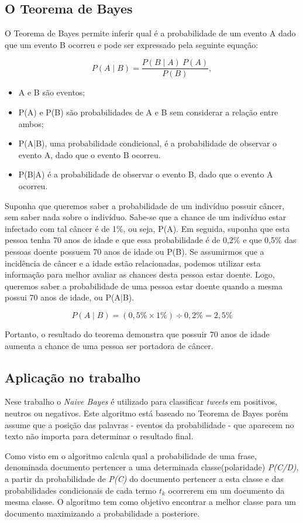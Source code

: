 \subsection{O Teorema de Bayes}

O Teorema de Bayes permite inferir qual é a probabilidade de um evento A dado que um evento B ocorreu e pode ser expressado pela seguinte equação:

$$ P(A \mid B) = \frac{P(B \mid A) \ P(A)}{P(B)}, $$

\begin{itemize}
	\item A e B são eventos;
	\item P(A) e P(B) são probabilidades de A e B sem considerar a relação entre ambos;
	\item P(A|B), uma probabilidade condicional, é a probabilidade de observar o evento A, dado que o evento B ocorreu.
	\item P(B|A) é a probabilidade de observar o evento B, dado que o evento A ocorreu.
\end{itemize}

Suponha que queremos saber a probabilidade de um indivíduo possuir câncer, sem saber nada sobre o indivíduo. Sabe-se que a chance de um indivíduo estar infectado com tal câncer é de 1\%, ou seja, P(A).
Em seguida, suponha que esta pessoa tenha 70 anos de idade e que essa probabilidade é de 0,2\% e que 0,5\% das pessoas doente possuem 70 anos de idade ou P(B). Se assumirmos que a incidência de câncer e a idade estão relacionadas, podemos utilizar esta informação para melhor avaliar as chances desta pessoa estar doente. Logo, queremos saber a probabilidade de uma pessoa estar doente quando a mesma possui 70 anos de idade, ou P(A|B).

$$ P(A \mid B) = (0,5\% \times 1\%) \div 0,2\% = 2,5\% $$

Portanto, o resultado do teorema demonstra que possuir 70 anos de idade aumenta a chance de uma pessoa ser portadora de câncer.

\subsection{Aplicação no trabalho}

Nese trabalho o \emph{Naive Bayes} é utilizado  para classificar \textit{tweets} em positivos, neutros ou negativos. Este algoritmo está baseado no Teorema de Bayes porém assume que a posição das palavras - eventos da probabilidade - que aparecem no texto não importa para determinar o resultado final.

Como visto em \cite{lucca2013implementaccao} o algoritmo calcula qual a probabilidade de uma frase, denominada documento pertencer a uma determinada classe(polaridade) \emph{P(C/D)}, a partir da probabilidade de \emph{P(C)} do documento pertencer a esta classe e das probabilidades condicionais de cada termo $t_{k}$ ocorrerem em um documento da mesma classe. O algoritmo tem como objetivo encontrar a melhor classe para um documento maximizando a probabilidade a posteriore. 

